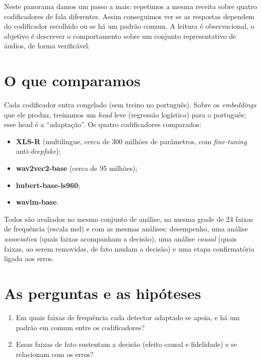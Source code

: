 \documentclass[11pt,a4paper]{article}
\begin{document}
Neste panorama damos um passo a mais: repetimos a mesma receita sobre quatro
codificadores de fala diferentes. Assim conseguimos ver se as respostas dependem
do codificador escolhido ou se há um padrão comum. A leitura é observacional, o
objetivo é descrever o comportamento sobre um conjunto representativo de áudios, de
forma verificável.

\section{O que comparamos}

Cada codificador entra congelado (sem treino no português). Sobre os
\emph{embeddings} que ele produz, treinamos um \emph{head} leve (regressão
logística) para o português; esse head é a ``adaptação''. Os quatro codificadores
comparados:

\begin{itemize}[nosep]
  \item \textbf{XLS-R} (multilíngue, cerca de 300 milhões de parâmetros, com
        \emph{fine-tuning} anti-\emph{deepfake});
  \item \textbf{wav2vec2-base} (cerca de 95 milhões);
  \item \textbf{hubert-base-ls960};
  \item \textbf{wavlm-base}.
\end{itemize}

Todos são avaliados no mesmo conjunto de análise, na mesma grade de 24 faixas de
frequência (escala mel) e com as mesmas análises: desempenho, uma análise
\emph{associativa} (quais faixas acompanham a decisão), uma análise \emph{causal}
(quais faixas, ao serem removidas, de fato mudam a decisão) e uma etapa
confirmatória ligada aos erros.

\section{As perguntas e as hipóteses}

\begin{enumerate}[label=\textbf{Q\arabic*.}]
  \item Em quais faixas de frequência cada detector adaptado se apoia, e há um padrão
        em comum entre os codificadores?
  \item Essas faixas de fato sustentam a decisão (efeito causal e fidelidade) e se
        relacionam com os erros?
\end{enumerate}
\end{document}
